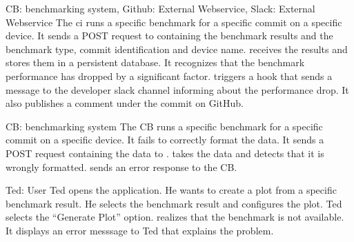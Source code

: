 {CB: \Gls{benchmarking system}, Github: External Webservice, Slack: External Webservice}
{The \acrshort{ci} runs a specific \gls{benchmark} for a specific commit on a specific device. It sends a POST request to \parkview{} containing the \glspl{benchmark result} and the \gls{benchmark type}, commit identification and device name. \parkview{} receives the results and stores them in a persistent database. It recognizes that the benchmark performance has dropped by a significant factor. \parkview{} triggers a hook that sends a message to the developer slack channel informing about the performance drop. It also publishes a comment under the commit on GitHub.}

{CB: \Gls{benchmarking system}}
{The CB runs a specific \gls{benchmark} for a specific commit on a specific device. It fails to correctly format the data. It sends a POST request containing the data to \parkview{}. \parkview{} takes the data and detects that it is wrongly formatted. \parkview{} sends an \gls{error response} to the CB.}

{Ted: User}
{Ted opens the application. He wants to create a \gls{plot} from a specific \gls{benchmark result}. He selects the \gls{benchmark result} and configures the \gls{plot}. Ted selects the \enquote{Generate Plot} option. \parkview{} realizes that the \gls{benchmark} is not available. It displays an error messsage to Ted that explains the problem.}
